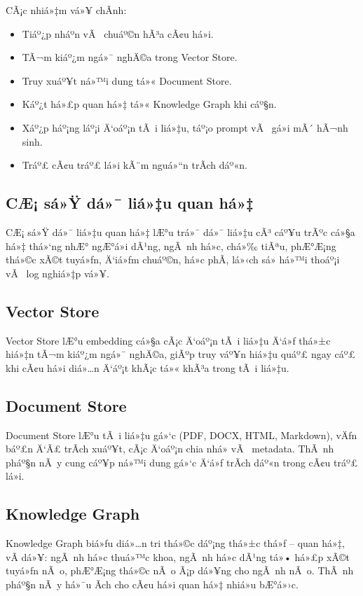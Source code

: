 ﻿\documentclass[12pt,a4paper]{report}
\begin{document}
CÃ¡c nhiá»‡m vá»¥ chÃ­nh:
\begin{itemize}
    \item Tiáº¿p nháº­n vÃ  chuáº©n hÃ³a cÃ¢u há»i.
    \item TÃ¬m kiáº¿m ngá»¯ nghÄ©a trong Vector Store.
    \item Truy xuáº¥t ná»™i dung tá»« Document Store.
    \item Káº¿t há»£p quan há»‡ tá»« Knowledge Graph khi cáº§n.
    \item Xáº¿p háº¡ng láº¡i Ä‘oáº¡n tÃ i liá»‡u, táº¡o prompt vÃ  gá»i mÃ´ hÃ¬nh sinh.
    \item Tráº£ cÃ¢u tráº£ lá»i kÃ¨m nguá»“n trÃ­ch dáº«n.
\end{itemize}

\subsection{CÆ¡ sá»Ÿ dá»¯ liá»‡u quan há»‡}

CÆ¡ sá»Ÿ dá»¯ liá»‡u quan há»‡ lÆ°u trá»¯ dá»¯ liá»‡u cÃ³ cáº¥u trÃºc cá»§a há»‡ thá»‘ng nhÆ° ngÆ°á»i dÃ¹ng, ngÃ nh há»c, chá»‰ tiÃªu, phÆ°Æ¡ng thá»©c xÃ©t tuyá»ƒn, Ä‘iá»ƒm chuáº©n, há»c phÃ­, lá»‹ch sá»­ há»™i thoáº¡i vÃ  log nghiá»‡p vá»¥.

\subsection{Vector Store}

Vector Store lÆ°u embedding cá»§a cÃ¡c Ä‘oáº¡n tÃ i liá»‡u Ä‘á»ƒ thá»±c hiá»‡n tÃ¬m kiáº¿m ngá»¯ nghÄ©a, giÃºp truy váº¥n hiá»‡u quáº£ ngay cáº£ khi cÃ¢u há»i diá»…n Ä‘áº¡t khÃ¡c tá»« khÃ³a trong tÃ i liá»‡u.

\subsection{Document Store}

Document Store lÆ°u tÃ i liá»‡u gá»‘c (PDF, DOCX, HTML, Markdown), vÄƒn báº£n Ä‘Ã£ trÃ­ch xuáº¥t, cÃ¡c Ä‘oáº¡n chia nhá» vÃ  metadata. ThÃ nh pháº§n nÃ y cung cáº¥p ná»™i dung gá»‘c Ä‘á»ƒ trÃ­ch dáº«n trong cÃ¢u tráº£ lá»i.

\subsection{Knowledge Graph}

Knowledge Graph biá»ƒu diá»…n tri thá»©c dáº¡ng thá»±c thá»ƒ -- quan há»‡, vÃ­ dá»¥: ngÃ nh há»c thuá»™c khoa, ngÃ nh há»c dÃ¹ng tá»• há»£p xÃ©t tuyá»ƒn nÃ o, phÆ°Æ¡ng thá»©c nÃ o Ã¡p dá»¥ng cho ngÃ nh nÃ o. ThÃ nh pháº§n nÃ y há»¯u Ã­ch cho cÃ¢u há»i quan há»‡ nhiá»u bÆ°á»›c.
\end{document}
